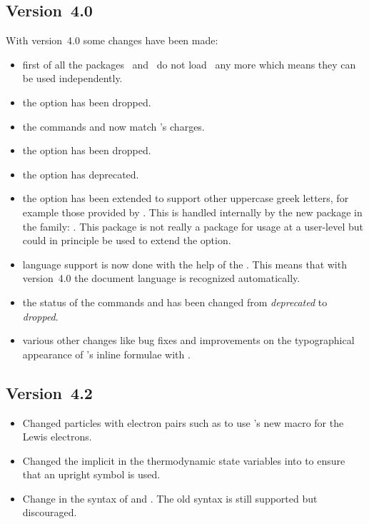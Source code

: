 \documentclass[load-preamble+]{cnltx-doc}
\begin{document}
\subsection{Version~4.0}
With version~4.0 some changes have been made:
\begin{itemize}
  \item first of all the packages \chemformula\ and \ghsystem\ do not load
    \chemmacros\ any more which means they can be used independently.
  \item the option  has been dropped.
  \item the commands  and  now match \chemformula's
    charges.
  \item the option  has been dropped.
  \item the option  has deprecated.
  \item the option  has been extended to support other uppercase
    greek letters, for example those provided by .  This is
    handled internally by the new package in the family: \chemgreek.  This
    package is not really a package for usage at a user-level but could in
    principle be used to extend the  option.
  \item language support is now done with the help of the .
    This means that with version~4.0  the document language is recognized
    automatically.
  \item the status of the commands  and  has been changed
    from \emph{deprecated} to \emph{dropped}.
  \item various other changes like bug fixes and improvements on the
    typographical appearance of \chemformula's inline formulae with .
\end{itemize}

\subsection{Version~4.2}

\begin{itemize}
  \item Changed particles with electron pairs such as  to use
    \chemformula's new macro  for the Lewis electrons.
  \item Changed the implicit  in the thermodynamic state variables
    into  to ensure that an upright symbol is used.
  \item Change in the syntax of  and
    .  The old syntax is still supported but discouraged.
\end{itemize}
\end{document}
